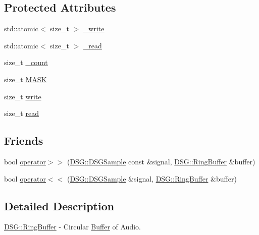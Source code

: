 \subsection*{Protected Attributes}
\begin{DoxyCompactItemize}
\item 
std\+::atomic$<$ size\+\_\+t $>$ \hyperlink{class_d_s_g_1_1_ring_buffer_a78bd7704fd059b745bc82421e1062123}{\+\_\+write}
\item 
std\+::atomic$<$ size\+\_\+t $>$ \hyperlink{class_d_s_g_1_1_ring_buffer_aa71bb75a5d24700be795a30e1a135a54}{\+\_\+read}
\item 
size\+\_\+t \hyperlink{class_d_s_g_1_1_ring_buffer_af6d0e1658a1f1aa298218b890e458f2f}{\+\_\+count}
\item 
size\+\_\+t \hyperlink{class_d_s_g_1_1_ring_buffer_a2fba2ff6ee3886101f0f58b0fd7f3641}{M\+A\+S\+K}
\item 
size\+\_\+t \hyperlink{class_d_s_g_1_1_ring_buffer_a703434b6afb87f1f9a05750278a822e3}{write}
\item 
size\+\_\+t \hyperlink{class_d_s_g_1_1_ring_buffer_a34bc659c286c8913e318c0e8c0777204}{read}
\end{DoxyCompactItemize}
\subsection*{Friends}
\begin{DoxyCompactItemize}
\item 
bool \hyperlink{class_d_s_g_1_1_ring_buffer_ab2e393fa39dc9b012eee8fe461e506cc}{operator$>$$>$} (\hyperlink{namespace_d_s_g_ac39a94cd27ebcd9c1e7502d0c624894a}{D\+S\+G\+::\+D\+S\+G\+Sample} const \&signal, \hyperlink{class_d_s_g_1_1_ring_buffer}{D\+S\+G\+::\+Ring\+Buffer} \&buffer)
\item 
bool \hyperlink{class_d_s_g_1_1_ring_buffer_a9eaa68fffdd0fcdccdccc0ee4a1ac711}{operator$<$$<$} (\hyperlink{namespace_d_s_g_ac39a94cd27ebcd9c1e7502d0c624894a}{D\+S\+G\+::\+D\+S\+G\+Sample} \&signal, \hyperlink{class_d_s_g_1_1_ring_buffer}{D\+S\+G\+::\+Ring\+Buffer} \&buffer)
\end{DoxyCompactItemize}


\subsection{Detailed Description}
\hyperlink{class_d_s_g_1_1_ring_buffer}{D\+S\+G\+::\+Ring\+Buffer} -\/ Circular \hyperlink{class_d_s_g_1_1_buffer}{Buffer} of Audio. 

